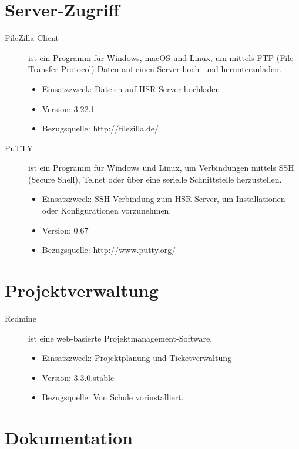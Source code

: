 \newpage
\section{Server-Zugriff}

\begin{description}
	\item [FileZilla Client] ist ein Programm für Windows, macOS und Linux, um mittels FTP (File Transfer Protocol) Daten auf einen Server hoch- und herunterzuladen. \cite{wikipedia_filezilla}
	\begin{itemize}
		\item Einsatzzweck: Dateien auf HSR-Server hochladen
		\item Version: 3.22.1
		\item Bezugsquelle: http://filezilla.de/
	\end{itemize}
	
	
	\item [PuTTY] ist ein Programm für Windows und Linux, um Verbindungen mittels SSH (Secure Shell), Telnet oder über eine serielle Schnittstelle herzustellen. \cite{wikipedia_putty}
	\begin{itemize}
		\item Einsatzzweck: SSH-Verbindung zum HSR-Server, um Installationen oder Konfigurationen vorzunehmen.
		\item Version: 0.67
		\item Bezugsquelle: http://www.putty.org/
	\end{itemize}
\end{description}



\section{Projektverwaltung}

\begin{description}
	\item [Redmine] ist eine web-basierte Projektmanagement-Software.
	\begin{itemize}
		\item Einsatzzweck: Projektplanung und Ticketverwaltung
		\item Version: 3.3.0.stable
		\item Bezugsquelle: Von Schule vorinstalliert.
	\end{itemize}
\end{description}


\newpage
\section{Dokumentation}

